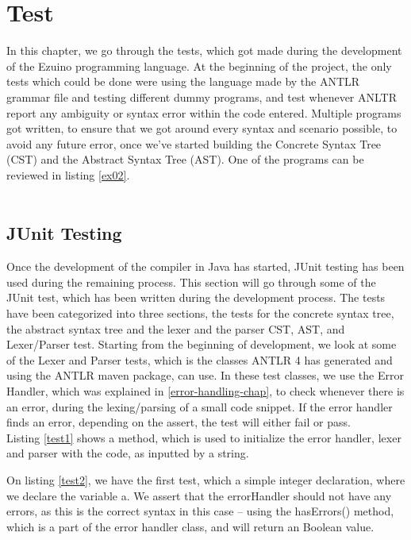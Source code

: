 \chapter{Test}
In this chapter, we go through the tests, which got made during the development of the Ezuino programming language. At the beginning of the project, the only tests which could be done were using the language made by the ANTLR grammar file and testing different dummy programs, and test whenever ANLTR report any ambiguity or syntax error within the code entered. Multiple programs got written, to ensure that we got around every syntax and scenario possible, to avoid any future error, once we’ve started building the Concrete Syntax Tree (CST) and the Abstract Syntax Tree (AST).  One of the programs can be reviewed in listing \ref{ex02}.
\\\\
\section{JUnit Testing}
Once the development of the compiler in Java has started, JUnit testing has been used during the remaining process. This section will go through some of the JUnit test, which has been written during the development process. The tests have been categorized into three sections, the tests for the concrete syntax tree, the abstract syntax tree and the lexer and the parser CST, AST, and Lexer/Parser test.
Starting from the beginning of development, we look at some of the Lexer and Parser tests, which is the classes ANTLR 4 has generated and using the ANTLR maven package, can use. In these test classes, we use the Error Handler, which was explained in \ref{error-handling-chap}, to check whenever there is an error, during the lexing/parsing of a small code snippet. If the error handler finds an error, depending on the assert, the test will either fail or pass.\\
Listing \ref{test1} shows a method, which is used to initialize the error handler, lexer and parser with the code, as inputted by a string.

\noindent\newline

On listing \ref{test2}, we have the first test, which a simple integer declaration, where we declare the variable a. We assert that the errorHandler should not have any errors, as this is the correct syntax in this case – using the hasErrors() method, which is a part of the error handler class, and will return an Boolean value.

\noindent\newline

